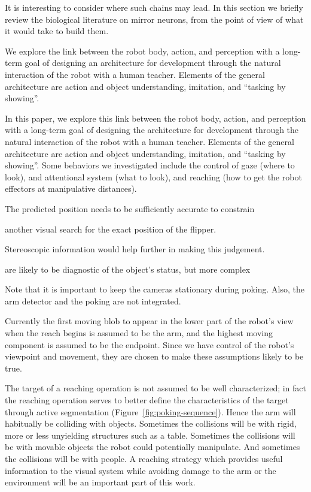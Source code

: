 It is interesting to consider where such
chains may lead.  In this section we briefly review the biological
literature on mirror neurons, from the point of view of what it 
would take to build them.

We explore the link between the robot body, action,
and perception with a long-term goal of designing an architecture for
development through the natural interaction of the robot with a human
teacher. Elements of the general architecture are action and object
understanding, imitation, and ``tasking by showing''. 


In this paper, we explore this link between the robot body, action,
and perception with a long-term goal of designing the architecture for
development through the natural interaction of the robot with a human
teacher. Elements of the general architecture are action and object
understanding, imitation, and ``tasking by showing''. Some behaviors
we investigated include the control of gaze (where to look), and
attentional system (what to look), and reaching (how to get the robot
effectors at manipulative distances).

The predicted position needs to be sufficiently accurate to constrain

another visual search for the exact position of the flipper.

Stereoscopic information would help further in making this
judgement.  

are likely to be diagnostic of the object's status, but more complex

Note that it is important to keep the cameras
stationary during poking.  Also, the arm detector and the poking are
not integrated.

Currently the first moving blob
to appear in the lower part of the robot's view when the reach begins
is assumed to be the arm, and the highest moving component is assumed
to be the endpoint.  Since we have control of the robot's viewpoint
and movement, they are chosen to make these assumptions likely to be
true.  



The target of a reaching operation is not assumed to be well
characterized; in fact the reaching operation serves to better define
the characteristics of the target through active segmentation
(Figure~\ref{fig:poking-sequence}).  
Hence the arm will habitually be
colliding with objects.  Sometimes the collisions will be with rigid,
more or less unyielding structures such as a table.  Sometimes the
collisions will be with movable objects the robot could potentially
manipulate.  And sometimes the collisions will be with people.  A
reaching strategy which provides useful information to the visual
system while avoiding damage to the arm or the environment will be an
important part of this work.

